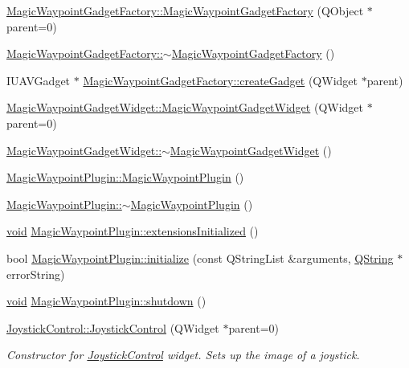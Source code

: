 \begin{DoxyCompactItemize}
\item 
\hyperlink{group___g_c_s_control_gadget_plugin_gae7ad3cb8d55b05f06354047f33941fc1}{Magic\-Waypoint\-Gadget\-Factory\-::\-Magic\-Waypoint\-Gadget\-Factory} (Q\-Object $\ast$parent=0)
\item 
\hyperlink{group___g_c_s_control_gadget_plugin_ga0b16d239f1aa3859ed11c4a572a9e5fd}{Magic\-Waypoint\-Gadget\-Factory\-::$\sim$\-Magic\-Waypoint\-Gadget\-Factory} ()
\item 
I\-U\-A\-V\-Gadget $\ast$ \hyperlink{group___g_c_s_control_gadget_plugin_gac8c3a2facf7fe1515b2d277b58ee9d0b}{Magic\-Waypoint\-Gadget\-Factory\-::create\-Gadget} (Q\-Widget $\ast$parent)
\item 
\hyperlink{group___g_c_s_control_gadget_plugin_ga6b1ff9f71795c087e84d4d30b1a60c6d}{Magic\-Waypoint\-Gadget\-Widget\-::\-Magic\-Waypoint\-Gadget\-Widget} (Q\-Widget $\ast$parent=0)
\item 
\hyperlink{group___g_c_s_control_gadget_plugin_ga2ffd0cf503fdefb31aa45a42b5cf63ba}{Magic\-Waypoint\-Gadget\-Widget\-::$\sim$\-Magic\-Waypoint\-Gadget\-Widget} ()
\item 
\hyperlink{group___g_c_s_control_gadget_plugin_ga89fc30c92d7ea9574134d87f7378a2b6}{Magic\-Waypoint\-Plugin\-::\-Magic\-Waypoint\-Plugin} ()
\item 
\hyperlink{group___g_c_s_control_gadget_plugin_ga4f66f5fe1f496bc719c7ca504b944579}{Magic\-Waypoint\-Plugin\-::$\sim$\-Magic\-Waypoint\-Plugin} ()
\item 
\hyperlink{group___u_a_v_objects_plugin_ga444cf2ff3f0ecbe028adce838d373f5c}{void} \hyperlink{group___g_c_s_control_gadget_plugin_gaf45230b46b95ad6f1a8f74dc1023b94a}{Magic\-Waypoint\-Plugin\-::extensions\-Initialized} ()
\item 
bool \hyperlink{group___g_c_s_control_gadget_plugin_ga2c2d28520438e765c6e3ba288777e894}{Magic\-Waypoint\-Plugin\-::initialize} (const Q\-String\-List \&arguments, \hyperlink{group___u_a_v_objects_plugin_gab9d252f49c333c94a72f97ce3105a32d}{Q\-String} $\ast$error\-String)
\item 
\hyperlink{group___u_a_v_objects_plugin_ga444cf2ff3f0ecbe028adce838d373f5c}{void} \hyperlink{group___g_c_s_control_gadget_plugin_gaa9be91fd32c41e37bfdbd77c2420373f}{Magic\-Waypoint\-Plugin\-::shutdown} ()
\item 
\hyperlink{group___g_c_s_control_gadget_plugin_ga77373f65ad7f3da249f63ebd5d64a736}{Joystick\-Control\-::\-Joystick\-Control} (Q\-Widget $\ast$parent=0)
\begin{DoxyCompactList}\small\item\em Constructor for \hyperlink{class_joystick_control}{Joystick\-Control} widget. Sets up the image of a joystick. \end{DoxyCompactList}\item 

\end{DoxyCompactItemize}
